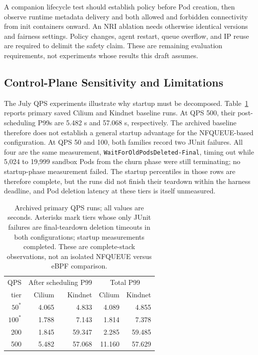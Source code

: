 \documentclass[letterpaper,twocolumn,10pt]{article}
\begin{document}
A companion lifecycle test should establish policy before Pod creation,
then observe runtime metadata delivery and both allowed and forbidden
connectivity from init containers onward. An NRI ablation needs otherwise
identical versions and fairness settings. Policy changes, agent restart,
queue overflow, and IP reuse are required to delimit the safety claim.
These are remaining evaluation requirements, not experiments whose
results this draft assumes.

\subsection{Control-Plane Sensitivity and Limitations}
The July QPS experiments illustrate why startup must be decomposed.
Table~\ref{tab:qps} reports primary saved Cilium and Kindnet baseline
runs. At QPS 500, their post-scheduling P99s are 5.482 s and 57.068 s,
respectively. The archived baseline therefore does not establish a
general startup advantage for the NFQUEUE-based configuration. At
QPS 50 and 100, both families record two JUnit failures. All four are
the same measurement, \texttt{WaitForOldPodsDeleted-Final}, timing out
while 5,024 to 19,999 sandbox Pods from the churn phase were still
terminating; no startup-phase measurement failed. The startup
percentiles in those rows are therefore complete, but the runs did not
finish their teardown within the harness deadline, and Pod deletion
latency at these tiers is itself unmeasured.

\begin{table}[t]
\centering
\small
\begin{tabular}{rrrrr}
\toprule
QPS & \multicolumn{2}{c}{After scheduling P99} & \multicolumn{2}{c}{Total P99}\\
tier & Cilium & Kindnet & Cilium & Kindnet\\
\midrule
$50^{*}$ & 4.065 & 4.833 & 4.089 & 4.855\\
$100^{*}$ & 1.788 & 7.143 & 1.814 & 7.378\\
200 & 1.845 & 59.347 & 2.285 & 59.485\\
500 & 5.482 & 57.068 & 11.160 & 57.629\\
\bottomrule
\end{tabular}
\caption{Archived primary QPS runs; all values are seconds. Asterisks mark
tiers whose only JUnit failures are final-teardown deletion timeouts in
both configurations; startup measurements completed. These are
complete-stack observations, not an isolated NFQUEUE versus eBPF
comparison.}
\label{tab:qps}
\end{table}
\end{document}
